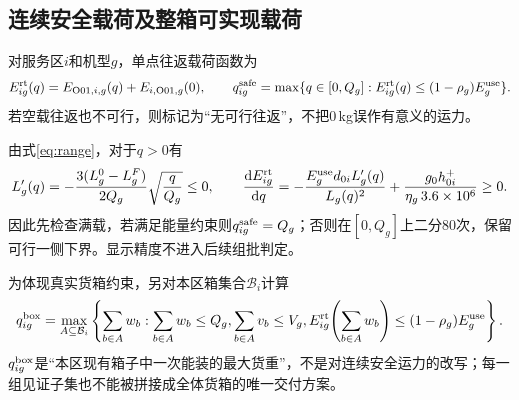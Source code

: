 \documentclass[a4paper]{my_paper}%
\numberwithin{equation}{section}
\theoremstyle{definition}
\begin{document}
\subsection{连续安全载荷及整箱可实现载荷}
对服务区$i$和机型$g$，单点往返载荷函数为
\begin{equation}
 E_{ig}^{\rm rt}(q)=E_{\mathrm{O01},i,g}(q)+E_{i,\mathrm{O01},g}(0),\qquad
 q_{ig}^{\rm safe}=\max\{q\in[0,Q_g]:E_{ig}^{\rm rt}(q)\le(1-\rho_g)E_g^{\rm use}\}.
 \label{eq:safepayload}
\end{equation}
若空载往返也不可行，则标记为“无可行往返”，不把0\,kg误作有意义的运力。

由式\eqref{eq:range}，对于$q>0$有
\begin{equation}
 L_g'(q)=-\frac{3(L_g^0-L_g^F)}{2Q_g}\sqrt{\frac{q}{Q_g}}\le0,\qquad
 \frac{\mathrm d E_{ig}^{\rm rt}}{\mathrm d q}
 =-\frac{E_g^{\rm use}d_{0i}L_g'(q)}{L_g(q)^2}
 +\frac{g_0h_{0i}^{+}}{\eta_g\,3.6\times10^6}\ge0.
 \label{eq:monotone}
\end{equation}
因此先检查满载，若满足能量约束则$q_{ig}^{\rm safe}=Q_g$；否则在$[0,Q_g]$上二分80次，保留可行一侧下界。显示精度不进入后续组批判定。

为体现真实货箱约束，另对本区箱集合$\mathcal B_i$计算
\begin{equation}
 q_{ig}^{\rm box}=\max_{A\subseteq\mathcal B_i}
 \left\{\sum_{b\in A}w_b:
 \sum_{b\in A}w_b\le Q_g,
 \sum_{b\in A}v_b\le V_g,
 E_{ig}^{\rm rt}\!\left(\sum_{b\in A}w_b\right)\le(1-\rho_g)E_g^{\rm use}\right\}.
 \label{eq:boxpayload}
\end{equation}
$q_{ig}^{\rm box}$是“本区现有箱子中一次能装的最大货重”，不是对连续安全运力的改写；每一组见证子集也不能被拼接成全体货箱的唯一交付方案。
\end{document}
